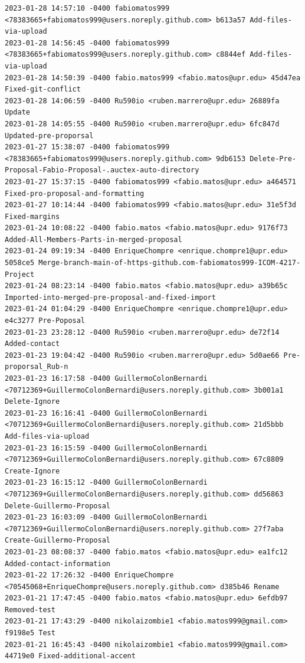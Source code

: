 \documentclass[12pt]{article}
\begin{document}
\begin{verbatim}
2023-01-28 14:57:10 -0400 fabiomatos999 <78383665+fabiomatos999@users.noreply.github.com> b613a57 Add-files-via-upload
2023-01-28 14:56:45 -0400 fabiomatos999 <78383665+fabiomatos999@users.noreply.github.com> c8844ef Add-files-via-upload
2023-01-28 14:50:39 -0400 fabio.matos999 <fabio.matos@upr.edu> 45d47ea Fixed-git-conflict
2023-01-28 14:06:59 -0400 Ru590io <ruben.marrero@upr.edu> 26889fa Update
2023-01-28 14:05:55 -0400 Ru590io <ruben.marrero@upr.edu> 6fc847d Updated-pre-proporsal
2023-01-27 15:38:07 -0400 fabiomatos999 <78383665+fabiomatos999@users.noreply.github.com> 9db6153 Delete-Pre-Proposal-Fabio-Proposal-.auctex-auto-directory
2023-01-27 15:37:15 -0400 fabiomatos999 <fabio.matos@upr.edu> a464571 Fixed-pro-proposal-and-formatting
2023-01-27 10:14:44 -0400 fabiomatos999 <fabio.matos@upr.edu> 31e5f3d Fixed-margins
2023-01-24 10:08:22 -0400 fabio.matos <fabio.matos@upr.edu> 9176f73 Added-All-Members-Parts-in-merged-proposal
2023-01-24 09:19:34 -0400 EnriqueChompre <enrique.chompre1@upr.edu> 5058ce5 Merge-branch-main-of-https-github.com-fabiomatos999-ICOM-4217-Project
2023-01-24 08:23:14 -0400 fabio.matos <fabio.matos@upr.edu> a39b65c Imported-into-merged-pre-proposal-and-fixed-import
2023-01-24 01:04:29 -0400 EnriqueChompre <enrique.chompre1@upr.edu> e4c3277 Pre-Poposal
2023-01-23 23:28:12 -0400 Ru590io <ruben.marrero@upr.edu> de72f14 Added-contact
2023-01-23 19:04:42 -0400 Ru590io <ruben.marrero@upr.edu> 5d0ae66 Pre-proporsal_Rub-n
2023-01-23 16:17:58 -0400 GuillermoColonBernardi <70712369+GuillermoColonBernardi@users.noreply.github.com> 3b001a1 Delete-Ignore
2023-01-23 16:16:41 -0400 GuillermoColonBernardi <70712369+GuillermoColonBernardi@users.noreply.github.com> 21d5bbb Add-files-via-upload
2023-01-23 16:15:59 -0400 GuillermoColonBernardi <70712369+GuillermoColonBernardi@users.noreply.github.com> 67c8809 Create-Ignore
2023-01-23 16:15:12 -0400 GuillermoColonBernardi <70712369+GuillermoColonBernardi@users.noreply.github.com> dd56863 Delete-Guillermo-Proposal
2023-01-23 16:03:09 -0400 GuillermoColonBernardi <70712369+GuillermoColonBernardi@users.noreply.github.com> 27f7aba Create-Guillermo-Proposal
2023-01-23 08:08:37 -0400 fabio.matos <fabio.matos@upr.edu> ea1fc12 Added-contact-information
2023-01-22 17:26:32 -0400 EnriqueChompre <70545068+EnriqueChompre@users.noreply.github.com> d385b46 Rename
2023-01-21 17:47:45 -0400 fabio.matos <fabio.matos@upr.edu> 6efdb97 Removed-test
2023-01-21 17:43:29 -0400 nikolaizombie1 <fabio.matos999@gmail.com> f9198e5 Test
2023-01-21 16:45:43 -0400 nikolaizombie1 <fabio.matos999@gmail.com> 44719e0 Fixed-additional-accent

\end{verbatim}
\end{document}
